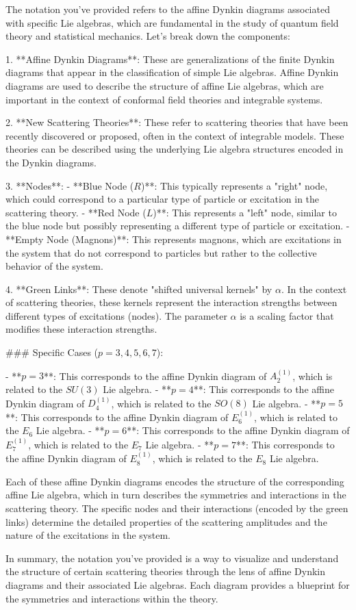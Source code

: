 The notation you've provided refers to the affine Dynkin diagrams associated with specific Lie algebras, which are fundamental in the study of quantum field theory and statistical mechanics. Let's break down the components:

1. **Affine Dynkin Diagrams**: These are generalizations of the finite Dynkin diagrams that appear in the classification of simple Lie algebras. Affine Dynkin diagrams are used to describe the structure of affine Lie algebras, which are important in the context of conformal field theories and integrable systems.

2. **New Scattering Theories**: These refer to scattering theories that have been recently discovered or proposed, often in the context of integrable models. These theories can be described using the underlying Lie algebra structures encoded in the Dynkin diagrams.

3. **Nodes**:
   - **Blue Node ($R$)**: This typically represents a "right" node, which could correspond to a particular type of particle or excitation in the scattering theory.
   - **Red Node ($L$)**: This represents a "left" node, similar to the blue node but possibly representing a different type of particle or excitation.
   - **Empty Node (Magnons)**: This represents magnons, which are excitations in the system that do not correspond to particles but rather to the collective behavior of the system.

4. **Green Links**: These denote "shifted universal kernels" by \(\alpha\). In the context of scattering theories, these kernels represent the interaction strengths between different types of excitations (nodes). The parameter \(\alpha\) is a scaling factor that modifies these interaction strengths.

### Specific Cases (\(p = 3, 4, 5, 6, 7\)):

- **\(p = 3\)**: This corresponds to the affine Dynkin diagram of \(A_2^{(1)}\), which is related to the \(SU(3)\) Lie algebra.
- **\(p = 4\)**: This corresponds to the affine Dynkin diagram of \(D_4^{(1)}\), which is related to the \(SO(8)\) Lie algebra.
- **\(p = 5\)**: This corresponds to the affine Dynkin diagram of \(E_6^{(1)}\), which is related to the \(E_6\) Lie algebra.
- **\(p = 6\)**: This corresponds to the affine Dynkin diagram of \(E_7^{(1)}\), which is related to the \(E_7\) Lie algebra.
- **\(p = 7\)**: This corresponds to the affine Dynkin diagram of \(E_8^{(1)}\), which is related to the \(E_8\) Lie algebra.

Each of these affine Dynkin diagrams encodes the structure of the corresponding affine Lie algebra, which in turn describes the symmetries and interactions in the scattering theory. The specific nodes and their interactions (encoded by the green links) determine the detailed properties of the scattering amplitudes and the nature of the excitations in the system.

In summary, the notation you've provided is a way to visualize and understand the structure of certain scattering theories through the lens of affine Dynkin diagrams and their associated Lie algebras. Each diagram provides a blueprint for the symmetries and interactions within the theory.
